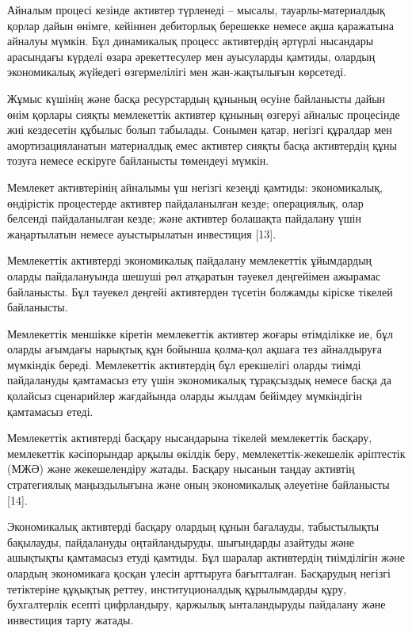 {Айналым процесі кезінде активтер түрленеді -- мысалы,
тауарлы-материалдық қорлар дайын өнімге, кейіннен дебиторлық берешекке
немесе ақша қаражатына айналуы мүмкін. Бұл динамикалық процесс
активтердің әртүрлі нысандары арасындағы күрделі өзара әрекеттесулер мен
ауысуларды қамтиды, олардың экономикалық жүйедегі өзгермелілігі мен
жан-жақтылығын көрсетеді.

Жұмыс күшінің және басқа ресурстардың құнының өсуіне байланысты дайын
өнім қорлары сияқты мемлекеттік активтер құнының өзгеруі айналыс
процесінде жиі кездесетін құбылыс болып табылады. Сонымен қатар, негізгі
құралдар мен амортизацияланатын материалдық емес активтер сияқты басқа
активтердің құны тозуға немесе ескіруге байланысты төмендеуі мүмкін.

Мемлекет активтерінің айналымы үш негізгі кезеңді қамтиды: экономикалық,
өндірістік процестерде активтер пайдаланылған кезде; операциялық, олар
белсенді пайдаланылған кезде; және активтер болашақта пайдалану үшін
жаңартылатын немесе ауыстырылатын инвестиция {[}13{]}.

Мемлекеттік активтерді экономикалық пайдалану мемлекеттік ұйымдардың
оларды пайдалануында шешуші рөл атқаратын тәуекел деңгейімен ажырамас
байланысты. Бұл тәуекел деңгейі активтерден түсетін болжамды кіріске
тікелей байланысты.

Мемлекеттік меншікке кіретін мемлекеттік активтер жоғары өтімділікке ие,
бұл оларды ағымдағы нарықтық құн бойынша қолма-қол ақшаға тез
айналдыруға мүмкіндік береді. Мемлекеттік активтердің бұл ерекшелігі
оларды тиімді пайдалануды қамтамасыз ету үшін экономикалық тұрақсыздық
немесе басқа да қолайсыз сценарийлер жағдайында оларды жылдам бейімдеу
мүмкіндігін қамтамасыз етеді.

Мемлекеттік активтерді басқару нысандарына тікелей мемлекеттік басқару,
мемлекеттік кәсіпорындар арқылы өкілдік беру, мемлекеттік-жекешелік
әріптестік (МЖӘ) және жекешелендіру жатады. Басқару нысанын таңдау
активтің стратегиялық маңыздылығына және оның экономикалық әлеуетіне
байланысты {[}14{]}.

Экономикалық активтерді басқару олардың құнын бағалауды, табыстылықты
бақылауды, пайдалануды оңтайландыруды, шығындарды азайтуды және
ашықтықты қамтамасыз етуді қамтиды. Бұл шаралар активтердің тиімділігін
және олардың экономикаға қосқан үлесін арттыруға бағытталған. Басқарудың
негізгі тетіктеріне құқықтық реттеу, институционалдық құрылымдарды құру,
бухгалтерлік есепті цифрландыру, қаржылық ынталандыруды пайдалану және
инвестиция тарту жатады.

}
